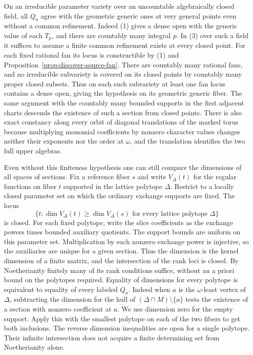 \documentclass[11pt,reqno]{amsart}
\numberwithin{equation}{section}
\theoremstyle{definition}
\theoremstyle{remark}
\begin{document}
On an irreducible parameter variety over an uncountable algebraically
closed field, all \(Q_a\) agree with the geometric generic ones at
very general points even without a common refinement. Indeed (1)
gives a dense open with the generic value of each \(T_p\), and
there are countably many integral \(p\). In (3) over such a field
it suffices to assume a finite common refinement exists at every
closed point. For each fixed rational fan its locus is constructible
by (1) and Proposition~\ref{prop:discover-source-fan}. There are
countably many rational fans, and no irreducible subvariety is covered
on its closed points by countably many proper closed subsets. Thus
on each such subvariety at least one fan locus contains a dense open,
giving the hypothesis on its geometric generic fiber. The same
argument with the countably many bounded supports in the first adjacent charts descends
the existence of such a section from closed points. There is also exact
constancy along every orbit of diagonal translations of the marked
torus because multiplying monomial coefficients by nonzero character
values changes neither their exponents nor the order at \(\omega\),
and the translation identifies the two full upper algebras.

Even without this finiteness hypothesis one can still compare the dimensions of all spaces of sections. Fix a reference fiber \(s\) and write \(V_\Delta(t)\) for
the regular functions on fiber \(t\) supported in the lattice polytope \(\Delta\).
Restrict to a locally closed parameter set on which the ordinary
exchange supports are fixed. The locus
\[ \{t:\dim V_\Delta(t)\ge\dim V_\Delta(s) \text{ for every lattice polytope }\Delta\} \]
is closed. For each fixed polytope, write the slice coefficients as
the exchange powers times bounded auxiliary quotients. The support
bounds are uniform on this parameter set. Multiplication by each
nonzero exchange power is injective, so the auxiliaries are unique
for a given section. Thus the dimension is the kernel dimension of
a finite matrix, and the intersection of the rank loci is closed. By
Noetherianity finitely many of its rank conditions suffice, without
an a priori bound on the polytopes required. Equality of dimensions for
every polytope is equivalent to equality of every labeled \(Q_a\).
Indeed when \(a\) is the \(\omega\)-least vertex of \(\Delta\),
subtracting the dimension for the hull of
\((\Delta\cap M)\setminus\{a\}\) tests the existence of a section
with nonzero coefficient at \(a\). We use dimension zero for the empty support. Apply this with the smallest polytope on each of the two
fibers to get both inclusions. The reverse dimension inequalities
are open for a single polytope. Their infinite intersection does
not acquire a finite determining set from Noetherianity alone.
\end{document}
